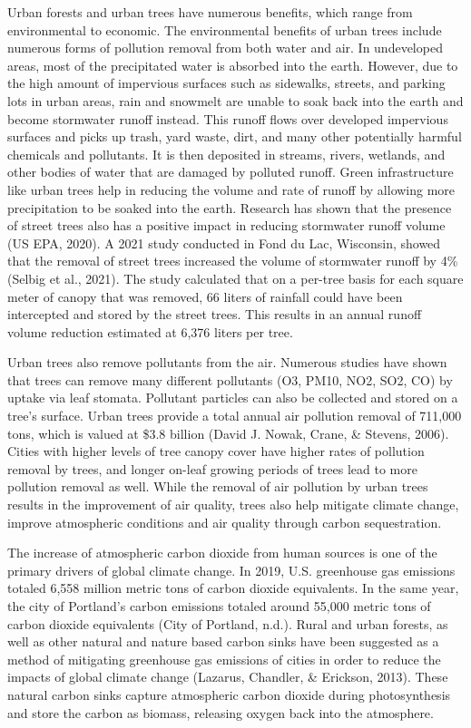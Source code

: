 \documentclass[12pt,twoside]{reedthesis}
\begin{document}
Urban forests and urban trees have numerous benefits, which range from environmental to economic. The environmental benefits of urban trees include numerous forms of pollution removal from both water and air. In undeveloped areas, most of the precipitated water is absorbed into the earth. However, due to the high amount of impervious surfaces such as sidewalks, streets, and parking lots in urban areas, rain and snowmelt are unable to soak back into the earth and become stormwater runoff instead. This runoff flows over developed impervious surfaces and picks up trash, yard waste, dirt, and many other potentially harmful chemicals and pollutants. It is then deposited in streams, rivers, wetlands, and other bodies of water that are damaged by polluted runoff. Green infrastructure like urban trees help in reducing the volume and rate of runoff by allowing more precipitation to be soaked into the earth. Research has shown that the presence of street trees also has a positive impact in reducing stormwater runoff volume (US EPA, 2020). A 2021 study conducted in Fond du Lac, Wisconsin, showed that the removal of street trees increased the volume of stormwater runoff by 4\% (Selbig et al., 2021). The study calculated that on a per-tree basis for each square meter of canopy that was removed, 66 liters of rainfall could have been intercepted and stored by the street trees. This results in an annual runoff volume reduction estimated at 6,376 liters per tree.

Urban trees also remove pollutants from the air. Numerous studies have shown that trees can remove many different pollutants (O3, PM10, NO2, SO2, CO) by uptake via leaf stomata. Pollutant particles can also be collected and stored on a tree's surface. Urban trees provide a total annual air pollution removal of 711,000 tons, which is valued at \$3.8 billion (David J. Nowak, Crane, \& Stevens, 2006). Cities with higher levels of tree canopy cover have higher rates of pollution removal by trees, and longer on-leaf growing periods of trees lead to more pollution removal as well. While the removal of air pollution by urban trees results in the improvement of air quality, trees also help mitigate climate change, improve atmospheric conditions and air quality through carbon sequestration.

The increase of atmospheric carbon dioxide from human sources is one of the primary drivers of global climate change. In 2019, U.S. greenhouse gas emissions totaled 6,558 million metric tons of carbon dioxide equivalents. In the same year, the city of Portland's carbon emissions totaled around 55,000 metric tons of carbon dioxide equivalents (City of Portland, n.d.). Rural and urban forests, as well as other natural and nature based carbon sinks have been suggested as a method of mitigating greenhouse gas emissions of cities in order to reduce the impacts of global climate change (Lazarus, Chandler, \& Erickson, 2013). These natural carbon sinks capture atmospheric carbon dioxide during photosynthesis and store the carbon as biomass, releasing oxygen back into the atmosphere.
\end{document}
